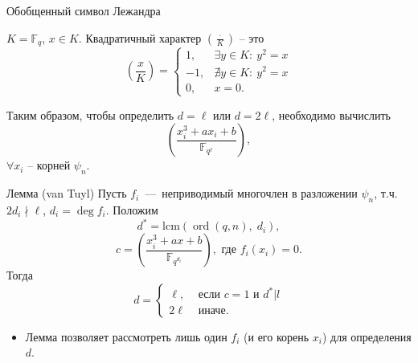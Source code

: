 \documentclass{beamer}
\begin{document}
\begin{frame}{Обобщенный символ Лежандра}
\begin{definition}
    $K = \mathbb{F}_q$, $x \in K$. Квадратичный характер $\left( \frac{ \cdot }{K} \right)$ -- это 
    $$
    \left( \frac{x}{K} \right ) =
    \begin{cases}
        1,& \exists y \in K:\:{y^2} = x \\
        -1,& \nexists y \in K:\:{y^2} = x \\
        0, & x = 0.
    \end{cases}
    $$
\end{definition}
Таким образом, чтобы определить $d = \ell$ или $d = 2\ell$, необходимо вычислить 
\[
\left(  {\frac{x_i^3 + a{x_i} + b}{\mathbb{F}_{q^\ell}}} \right ),
\]
$\forall x_i$ -- корней $\psi_n$. 
\end{frame}

\begin{frame}%
\begin{block}{Лемма (van Tuyl)}
    Пусть $f_i$~---~неприводимый многочлен в разложении ${\psi _n}$, т.ч. $2 d_i \nmid \ell$, $d_i = \deg f_i$. Положим
    \[
    {d^*} = \mathrm{lcm}( {\operatorname{ord} ( {q,n} ),\;{d_i}} ),
    \]
    \[
    c = \left(\frac{x_i^3 + a x + b}{\mathbb{F}_{q^{d_i}}} \right),{\text{ где }} f_i( x_i ) = 0.
    \]
    Тогда
    $$
    d = 
    \begin{cases}
        \ell, &\text{ если } c=1 \text{ и } d^*|l  \\
        2\ell & \text{ иначе. }
    \end{cases}
    $$
\end{block}
\begin{itemize}
    \item Лемма позволяет рассмотреть лишь один $f_i$ (и его корень $x_i$) для определения $d$. 
\end{itemize}
\end{frame}
\end{document}
